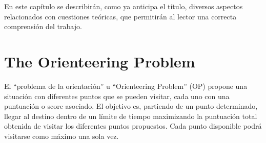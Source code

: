 %	
%
%
%

En este capítulo se describirán, como ya anticipa el título, diversos aspectos relacionados con cuestiones teóricas, que permitirán al lector una correcta comprensión del trabajo.

\section{The Orienteering Problem}
El ``problema de la orientación'' u ``Orienteering Problem'' (OP)\cite{op} propone una situación con diferentes puntos que se pueden visitar, cada uno con una puntuación o score asociado.
El objetivo es, partiendo de un punto determinado, llegar al destino dentro de un límite de tiempo maximizando la puntuación total obtenida de visitar los diferentes puntos propuestos. Cada punto disponible podrá visitarse como máximo una sola vez.

